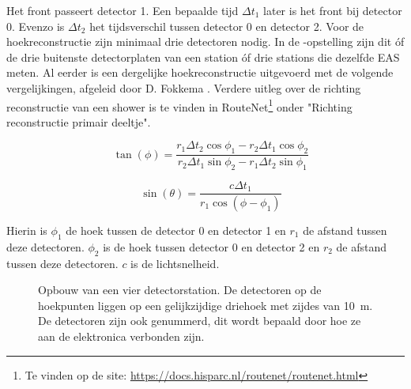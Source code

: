 Het front passeert detector 1. Een bepaalde tijd $\Delta t_1$ later is
het front bij detector 0. Evenzo is $\Delta t_2$ het tijdsverschil tussen detector 0 en detector 2. Voor
de hoekreconstructie zijn minimaal drie detectoren nodig. In de
\hisparc-opstelling zijn dit \'of de drie buitenste detectorplaten van een
station \'of drie stations die dezelfde EAS meten. Al eerder is een
dergelijke hoekreconstructie uitgevoerd met de volgende vergelijkingen,
afgeleid door D. Fokkema \cite{Fokkema}. Verdere uitleg over de richting
reconstructie van een shower is te vinden in
RouteNet\footnote{Te vinden op de site:
\url{https://docs.hisparc.nl/routenet/routenet.html}}
onder "Richting reconstructie primair deeltje".

\begin{equation}
   \quad\tan(\phi) = \frac{r_1\Delta t_2\cos\phi_1-r_2\Delta t_1\cos\phi_2}
                          {r_2\Delta t_1\sin\phi_2-r_1\Delta t_2\sin\phi_1}
\end{equation}

\begin{equation}
    \quad\sin(\theta) = \frac{c\Delta t_1}{r_1\cos(\phi-\phi_1)}
\end{equation}

Hierin is $\phi_1$ de hoek tussen de detector 0 en detector 1 en $r_1$ de
afstand tussen deze detectoren. $\phi_2$ is de hoek tussen detector 0 en
detector 2 en $r_2$ de afstand tussen deze detectoren. $c$ is de
lichtsnelheid.

\begin{figure}
    \centering
    
    \caption{Opbouw van een vier detectorstation. De detectoren op de
             hoekpunten liggen op een gelijkzijdige driehoek met zijdes
             van \SI{10}{\meter}. De detectoren zijn ook genummerd, dit
             wordt bepaald door hoe ze aan de \hisparc elektronica
             verbonden zijn.}
    \label{fig:stationlayout} 
\end{figure}

